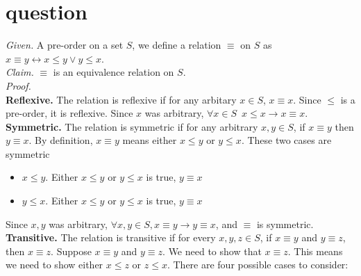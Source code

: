 \documentclass[11pt]{article}
\begin{document}
\section{question}
\emph{Given. } A pre-order on a set $S$, we define a relation $\equiv$ on $S$ as $x \equiv y\leftrightarrow x \leq y \lor y \leq x$. \medskip \\
\emph{Claim. } $\equiv$ is an equivalence relation on $S$. \medskip \\
\emph{Proof. } \\
\textbf{Reflexive. } The relation is reflexive if for any arbitary \( x \in S \), \( x \equiv x \).
Since \( \leq \) is a pre-order, it is reflexive. Since $x$ was arbitrary, \( \forall x \in S \)\, $x \leq x \rightarrow x \equiv x$. 
\\
\textbf{Symmetric. } The relation is symmetric if for any arbitrary $x,y \in S$, if $x \equiv y$ then $y \equiv x$. By definition, $x \equiv y$ means either $x \leq y$ or $y \leq x$. These two cases are symmetric
\begin{itemize}
\renewcommand{\labelitemi}{$\hookrightarrow$}
    \item $x \leq y$. Either $x \leq y$ or $y \leq x$ is true, $y \equiv x$
    \item $y \leq x$. Either $x \leq y$ or $y \leq x$ is true, $y \equiv x$
\end{itemize}
Since $x, y$ was arbitrary, $\forall x, y \in S, x \equiv y \rightarrow y \equiv x$, and $\equiv$ is symmetric. \\
\textbf{Transitive. } The relation is transitive if for every \( x, y, z \in S \), if \( x \equiv y \) and \( y \equiv z \), then \( x \equiv z \). Suppose \( x \equiv y \) and \( y \equiv z \). We need to show that \( x \equiv z \). This means we need to show either \( x \leq z \) or \( z \leq x \).
There are four possible cases to consider:
\end{document}
